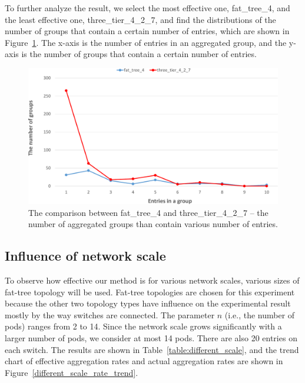 To further analyze the result, we select the most effective one, fat\_tree\_4, and the least effective one, three\_tier\_4\_2\_7, and find the distributions of the number of groups that contain a certain number of entries, which are shown in Figure~\ref{different_topo_distribute}. The x-axis is the number of entries in an aggregated group, and the y-axis is the number of groups that contain a certain number of entries.

\begin{figure}[H]
\centering 
\includegraphics[width=1\textwidth]{figures/exp_topotype_distribute.pdf}
\caption{The comparison between fat\_tree\_4 and three\_tier\_4\_2\_7 -- the number of aggregated groups than contain various number of entries.}
\label{different_topo_distribute}
\end{figure}

\subsection{Influence of network scale}
To observe how effective our method is for various network scales, various sizes of fat-tree topology will be used. Fat-tree topologies are chosen for this experiment because the other two topology types have influence on the experimental result mostly by the way switches are connected. The parameter $n$ (i.e., the number of pods) ranges from 2 to 14. Since the network scale grows significantly with a larger number of pods, we consider at most 14 pods. There are also 20 entries on each switch. The results are shown in Table~\ref{table:different_scale}, and the trend chart of effective aggregation rates and actual aggregation rates are shown in Figure~\ref{different_scale_rate_trend}.

